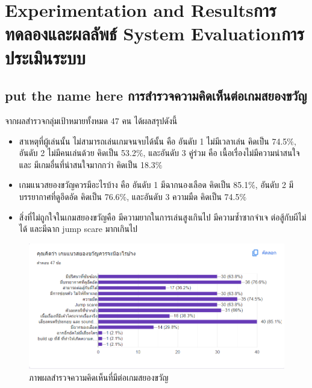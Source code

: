 \chapter{\ifproject%
      \ifenglish Experimentation and Results\else การทดลองและผลลัพธ์\fi
  \else%
      \ifenglish System Evaluation\else การประเมินระบบ\fi
  \fi}



\section{\ifenglish put the name here \else การสำรวจความคิดเห็นต่อเกมสยองขวัญ\fi}
จากผลสำรวจกลุ่มเป้าหมายทั้งหมด 47 คน ได้ผลสรุปดังนี้
\begin{itemize}
    \item สาเหตุที่ผู้เล่นนั้น ไม่สามารถเล่นเกมจนจบได้นั้น คือ อันดับ 1 ไม่มีเวลาเล่น คิดเป็น 74.5$\%$, อันดับ 2 ไม่มีคนเล่นด้วย คิดเป็น 53.2$\%$, และอันดับ 3 คู่ร่วม คือ เนื้อเรื่องไม่มีความน่าสนใจ และ มีเกมอื่นที่น่าสนใจมากกว่า คิดเป็น 18.3$\%$
    \item เกมแนวสยองขวัญควรมีอะไรบ้าง คือ อันดับ 1 มีฉากนองเลือด คิดเป็น 85.1$\%$, อันดับ 2 มีบรรยากาศที่ดูอึดอัด คิดเป็น 76.6$\%$, และอันดับ 3 ความมืด คิดเป็น 74.5$\%$
    \item สิ่งที่ไม่ถูกใจในเกมสยองขวัญคือ มีความยากในการเล่นสูงเกินไป มีความซ้ำซากจำเจ ต่อสู้กับผีไม่ได้ และมีฉาก jump scare มากเกินไป
\end{itemize}
\begin{figure}[h]
    \centering
    \includegraphics[width=\textwidth]{Images/Screenshot 2023-10-06 192027.png}
    \caption{ภาพผลสำรวจความคิดเห็นที่มีต่อเกมสยองขวัญ}\label{Empatize}
\end{figure}
